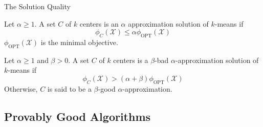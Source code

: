 \documentclass{beamer}
\begin{document}
\begin{frame}{The Solution Quality}
	\begin{definition}
		Let $\alpha \geq 1$. A set $C$ of $k$ centers is an $\alpha$ approximation solution of $k$-means if
		\begin{equation}
		\phi_C(\mathcal{X}) \leq \alpha \phi_\text{OPT}(\mathcal{X})
		\end{equation}
		$\phi_\text{OPT}(\mathcal{X})$ is the minimal objective.
	\end{definition}
	\begin{definition}
		Let $\alpha \geq 1$ and $\beta > 0$. A set $C$ of $k$ centers is a $\beta$-bad $\alpha$-approximation solution of $k$-means if
		\begin{equation}
		\phi_C(\mathcal{X}) > (\alpha + \beta)\phi_\text{OPT}(\mathcal{X})
		\end{equation}
		Otherwise, $C$ is said to be a $\beta$-good $\alpha$-approximation.
	\end{definition}
\end{frame}

\subsection{Provably Good Algorithms}
\end{document}
